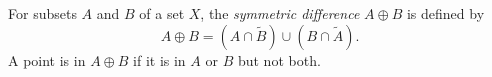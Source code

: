 For subsets $A$ and $B$ of a set $X$, the \textit{symmetric difference} $A \oplus B$ is defined by
$$A \oplus B = (A \cap \tilde{B}) \cup (B \cap \tilde{A}).$$
A point is in $A \oplus B$ if it is in $A$ or $B$ but not both.
